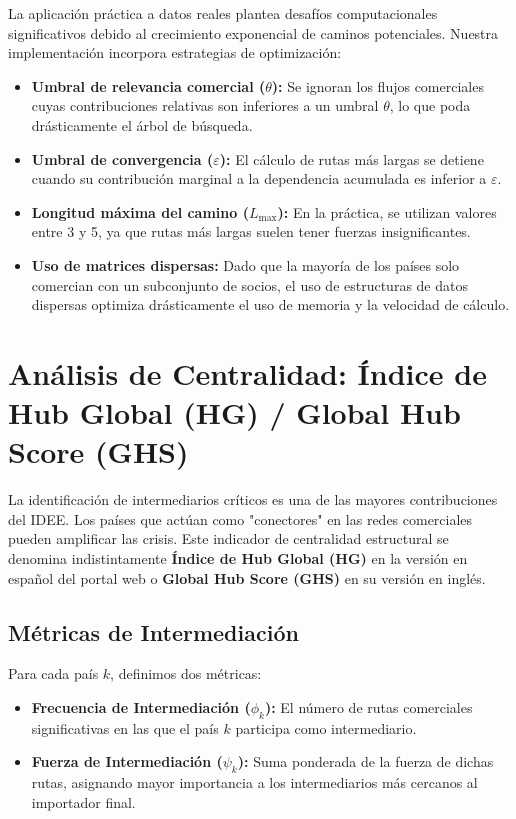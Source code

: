 \documentclass[final,1p,times,authoryear]{elsarticle}
\begin{document}
La aplicación práctica a datos reales plantea desafíos computacionales significativos debido al crecimiento exponencial de caminos potenciales. Nuestra implementación incorpora estrategias de optimización:
\begin{itemize}
    \item \textbf{Umbral de relevancia comercial ($\theta$):} Se ignoran los flujos comerciales cuyas contribuciones relativas son inferiores a un umbral $\theta$, lo que poda drásticamente el árbol de búsqueda.
    \item \textbf{Umbral de convergencia ($\varepsilon$):} El cálculo de rutas más largas se detiene cuando su contribución marginal a la dependencia acumulada es inferior a $\varepsilon$.
    \item \textbf{Longitud máxima del camino ($L_{\max}$):} En la práctica, se utilizan valores entre 3 y 5, ya que rutas más largas suelen tener fuerzas insignificantes.
    \item \textbf{Uso de matrices dispersas:} Dado que la mayoría de los países solo comercian con un subconjunto de socios, el uso de estructuras de datos dispersas optimiza drásticamente el uso de memoria y la velocidad de cálculo.
\end{itemize}

\section{Análisis de Centralidad: Índice de Hub Global (HG) / Global Hub Score (GHS)}

La identificación de intermediarios críticos es una de las mayores contribuciones del IDEE. Los países que actúan como "conectores" en las redes comerciales pueden amplificar las crisis. Este indicador de centralidad estructural se denomina indistintamente \textbf{Índice de Hub Global (HG)} en la versión en español del portal web o \textbf{Global Hub Score (GHS)} en su versión en inglés.

\subsection{Métricas de Intermediación}
Para cada país $k$, definimos dos métricas:
\begin{itemize}
    \item \textbf{Frecuencia de Intermediación ($\phi_k$):} El número de rutas comerciales significativas en las que el país $k$ participa como intermediario.
    \item \textbf{Fuerza de Intermediación ($\psi_k$):} Suma ponderada de la fuerza de dichas rutas, asignando mayor importancia a los intermediarios más cercanos al importador final.
\end{itemize}
\end{document}
